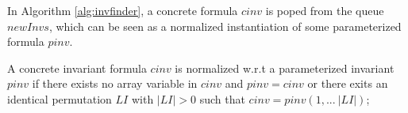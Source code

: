 \documentclass[final]{IEEEtran}
\newcommand\lyj[1]{\textcolor{magenta}{lyj: #1}}
\newcommand\caicomment[1]{\textcolor{red}{comment: #1} }
\begin{document}


In Algorithm \ref{alg:invfinder}, a concrete formula $cinv$ is poped from the queue $newInvs$, which can be seen as a normalized instantiation of some parameterized formula $pinv$. %


\begin{definition}
A  concrete invariant formula $cinv$ is normalized w.r.t a parameterized invariant $pinv$ if  there exists no array variable in $cinv$ and $pinv=cinv$ or there exits an identical permutation $LI$ with $|LI|>0$ such that $cinv=pinv(1,...~|LI|)$;

\end{definition}
\end{document}
